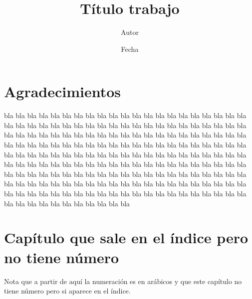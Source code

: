 \documentclass[12pt]{book}%
\theoremstyle{newstyle}%
\begin{document}
\title{Título trabajo}
\author{Autor}
\date{Fecha}
\maketitle

\tableofcontents





\chapter*{Agradecimientos}
\markboth{}{} %

bla bla bla bla bla bla bla bla bla bla bla bla bla bla bla bla bla bla bla bla bla bla bla bla bla bla bla bla bla bla bla bla bla bla bla bla bla bla bla bla bla bla bla bla bla bla bla bla bla bla bla bla bla bla bla bla bla bla bla bla bla bla bla bla bla bla bla bla bla bla bla bla bla bla bla bla bla bla bla bla bla bla bla bla bla bla bla bla bla bla bla bla bla bla bla bla bla bla bla bla bla bla bla bla bla bla bla bla bla bla bla bla bla bla bla bla bla bla bla bla bla bla bla bla bla bla bla bla bla bla bla bla bla bla bla bla bla bla bla bla bla bla bla bla bla bla bla bla bla bla bla bla bla bla bla bla bla bla bla bla bla bla bla bla bla bla bla bla bla bla bla bla bla bla bla bla bla bla bla bla bla bla bla bla bla bla bla bla bla bla bla bla bla bla bla bla bla bla bla bla




\chapter*{Capítulo que sale en el índice pero no tiene número}%

Nota que a partir de aquí la numeración es en arábicos y que este capítulo no tiene número pero si aparece en el índice.
\end{document}
